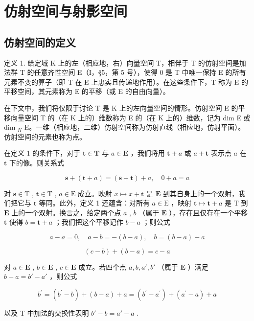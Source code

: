 \section{仿射空间与射影空间}

\subsection{仿射空间的定义}

定义 1. 给定域 K 上的左（相应地，右）向量空间 T，相伴于 T 的仿射空间是加法群 T 的任意齐性空间 E（I，§5，第 5 号），使得 0 是 T 中唯一保持 E 的所有元素不变的算子（即 T 在 E 上忠实且传递地作用）。在这些条件下，T 称为 E 的平移空间，其元素称为 E 的平移（或 E 的自由向量）。

在下文中，我们将仅限于讨论 T 是 K 上的左向量空间的情形。仿射空间 E 的平移向量空间 T 的（在 K 上的）维数称为 E 的（在 K 上的）维数，记为 dim E 或 dim \(_{K}\) E。一维（相应地，二维）仿射空间称为仿射直线（相应地，仿射平面）。仿射空间的元素也称为点。

在定义 1 的条件下，对于 \(\mathbf{t} \in \mathbf{T}\) 与 \(a \in \mathbf{E}\) ，我们将用 \(\mathbf{t} + a\) 或 \(a + \mathbf{t}\) 表示点 \(a\) 在 \(\mathbf{t}\) 下的像。则关系式

\[
\mathbf {s} + (\mathbf {t} + a) = (\mathbf {s} + \mathbf {t}) + a, \quad 0 + a = a\tag{1}
\]

对 \(\mathbf{s} \in \mathrm{T}\) , \(\mathbf{t} \in \mathrm{T}\) , \(a \in \mathrm{E}\) 成立。映射 \(x \mapsto x + \mathbf{t}\) 是 \(\mathbf{E}\) 到其自身上的一个双射，我们把它与 \(\mathbf{t}\) 等同。此外，定义 1 还蕴含：对所有 \(a \in \mathrm{E}\) ，映射 \(\mathbf{t} \mapsto \mathbf{t} + a\) 是 \(\mathrm{T}\) 到 \(\mathbf{E}\) 上的一个双射。换言之，给定两个点 \(a\) , \(b\) （属于 \(\mathbf{E}\) ），存在且仅存在一个平移 \(\mathbf{t}\) 使得 \(b = \mathbf{t} + a\) ；我们把这个平移记作 \(b - a\) ；则公式

\[
a - a = 0, \quad a - b = - (b - a), \quad b = (b - a) + a\tag{2}
\]

\[
(c - b) + (b - a) = c - a
\]

对 \(a \in \mathbf{E}\) , \(b \in \mathbf{E}\) , \(c \in \mathbf{E}\) 成立。若四个点 \(a, b, a', b'\) （属于 \(\mathbf{E}\) ）满足 \(b - a = b' - a'\) ，则公式

\[
b ^ {\prime} = \left(b ^ {\prime} - b\right) + (b - a) + a = \left(b ^ {\prime} - a ^ {\prime}\right) + \left(a ^ {\prime} - a\right) + a
\]

以及 T 中加法的交换性表明 \(b' - b = a' - a\) .

